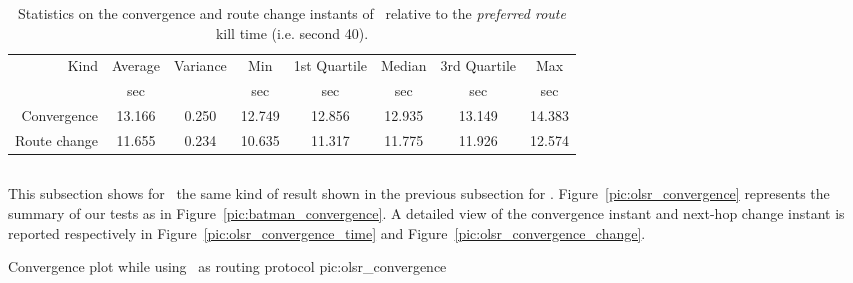        \begin{table}[htbp]
            \centering
            \begin{tabular}{rccccccc}
            \toprule
            Kind & Average & Variance & Min & 1st Quartile &
            Median & 3rd Quartile & Max \\
            & \footnotesize{sec} & & \footnotesize{sec} & \footnotesize{sec} &
            \footnotesize{sec} & \footnotesize{sec} & \footnotesize{sec} \\
            \midrule
            Convergence & 13.166  & 0.250 & 12.749 & 12.856 & 12.935 & 13.149 &14.383\\
            Route change & 11.655 & 0.234 & 10.635 & 11.317 & 11.775 & 11.926 & 12.574\\
            \bottomrule
            \end{tabular}
            \caption{Statistics on the convergence and route change
              instants of \batman\ relative to the \emph{preferred
                route} kill time (i.e. second 40).}
            \label{tab:convergence_batman}
        \end{table}

\subsection{\olsr}

    This subsection shows for \olsr\ the same kind of result shown in the
    previous subsection for \batman.  Figure~\ref{pic:olsr_convergence}
    represents the summary of our tests as in
    Figure~\ref{pic:batman_convergence}. A detailed view of the
    convergence instant and next-hop change instant is reported
    respectively in Figure~\ref{pic:olsr_convergence_time} and
    Figure~\ref{pic:olsr_convergence_change}.

            {\textwidth}
            {Convergence plot while using \olsr\ as routing protocol}
            {pic:olsr_convergence}

